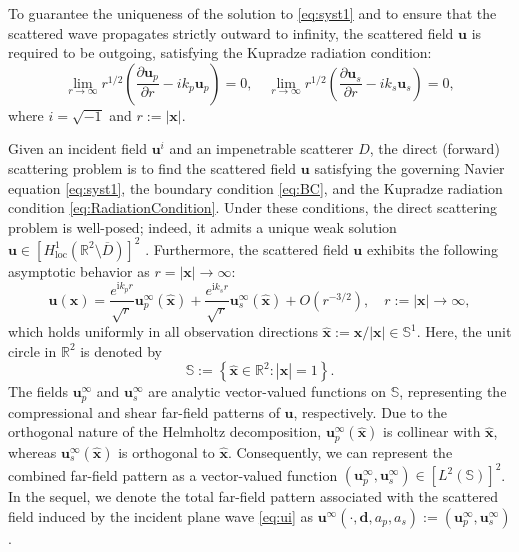 \documentclass[11pt,reqno,twoside]{amsart}
\theoremstyle{definition}
\theoremstyle{remark}
\numberwithin{equation}{section}
\begin{document}
To guarantee the uniqueness of the solution to \eqref{eq:syst1} and to ensure that the scattered wave propagates strictly outward to infinity, the scattered field $\mathbf{u}$ is required to be outgoing, satisfying the Kupradze radiation condition:
\begin{equation}\label{eq:RadiationCondition}
	\lim_{r \to \infty} r^{1/2} \left( \frac{\partial \mathbf{u}_p}{\partial r} - {i} k_p \mathbf{u}_p \right) = 0,
	\quad
	\lim_{r \to \infty} r^{1/2} \left( \frac{\partial \mathbf{u}_s}{\partial r} - {i} k_s \mathbf{u}_s \right) = 0,
\end{equation}
where $i=\sqrt{-1}$ and $r:=|\mathbf{x}|$. 



Given an incident field $\mathbf{u}^i$ and an impenetrable scatterer $D$, the direct (forward) scattering problem is to find the scattered field $\mathbf{u}$ satisfying the governing Navier equation \eqref{eq:syst1}, the boundary condition \eqref{eq:BC}, and the Kupradze radiation condition \eqref{eq:RadiationCondition}. Under these conditions, the direct scattering problem is well-posed; indeed, it admits a unique weak solution $\mathbf{u} \in [H^1_{\mathrm{loc}}(\mathbb{R}^2 \setminus \overline{D})]^2$ \cite{LWWZ16, KGBB79}. Furthermore, the scattered field $\mathbf{u}$ exhibits the following asymptotic behavior as $r=|\mathbf x|\rightarrow \infty$:
\begin{equation}\label{eq:asymptotic}
    \mathbf{u}(\mathbf{x})
    =
    \frac{e^{\mathrm{i}k_p r}}{\sqrt{r}} \mathbf{u}_p^\infty(\hat{\mathbf{x}})
    +
    \frac{e^{\mathrm{i}k_s r}}{\sqrt{r}} \mathbf{u}_s^\infty(\hat{\mathbf{x}})
    +
    O\left( r^{-3/2} \right),
    \quad r := |\mathbf{x}| \to \infty,
\end{equation}
which holds uniformly in all observation directions $\hat{\mathbf{x}} := \mathbf{x}/|\mathbf{x}| \in \mathbb{S}^1$. Here, the unit circle in $\mathbb{R}^2$ is denoted by
\begin{equation*}
    \mathbb{S} := \left\{ \hat{\mathbf{x}} \in \mathbb{R}^2 : |\hat{\mathbf{x}}| = 1 \right\}.
\end{equation*}
The fields $\mathbf{u}_p^\infty$ and $\mathbf{u}_s^\infty$ are analytic vector-valued functions on $\mathbb{S}$, representing the compressional and shear  far-field patterns of $\mathbf{u}$, respectively. Due to the orthogonal nature of the Helmholtz decomposition, $\mathbf{u}_p^\infty(\hat{\mathbf{x}})$ is collinear with $\hat{\mathbf{x}}$, whereas $\mathbf{u}_s^\infty(\hat{\mathbf{x}})$ is orthogonal to $\hat{\mathbf{x}}$. Consequently, we can represent the combined far-field pattern as a vector-valued function $(\mathbf{u}_p^\infty, \mathbf{u}_s^\infty) \in [L^2(\mathbb{S})]^2$. In the sequel, we denote the total far-field pattern associated with the scattered field induced by the incident plane wave \eqref{eq:ui} as $\mathbf{u}^\infty(\cdot, \mathbf{d}, a_p, a_s):=(\mathbf{u}_p^\infty, \mathbf{u}_s^\infty)$.
\end{document}
